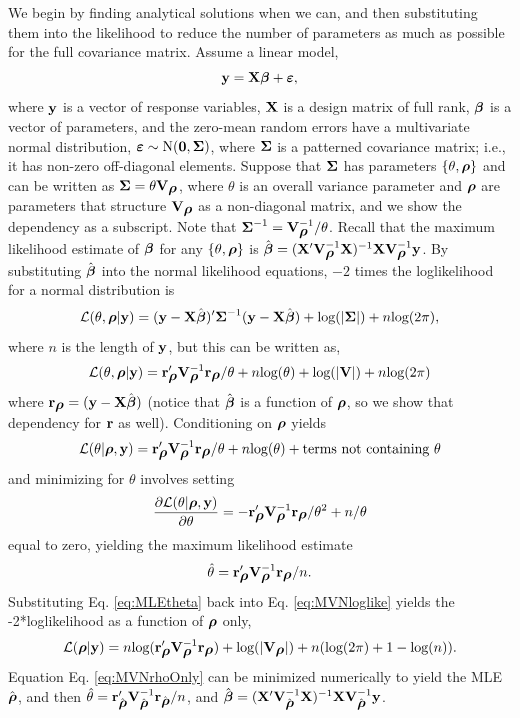 \documentclass[11pt, titlepage]{article}\usepackage[]{graphicx}\usepackage[]{color}
\begin{document}
\begin{spacing}{1.9}
\begin{flushleft}
We begin by finding analytical solutions when we can, and then substituting them into the likelihood to reduce the number of parameters as much as possible for the full covariance matrix.  Assume a linear model,
\[
  \by = \bX\bbeta + \bvarepsilon,
\]
where $\by$ is a vector of response variables, $\bX$ is a design matrix of full rank, $\bbeta$ is a vector of parameters, and the zero-mean random errors have a multivariate normal distribution, $\bvarepsilon \sim \textrm{N}(\bzero,\bSigma)$, where $\bSigma$ is a patterned covariance matrix; i.e., it has non-zero off-diagonal elements.  Suppose that $\bSigma$ has parameters $\{\theta,\brho\}$ and can be written as $\bSigma = \theta\bV_{\brho}$, where $\theta$ is an overall variance parameter and $\brho$ are parameters that structure $\bV_{\brho}$ as a non-diagonal matrix, and we show the dependency as a subscript. Note that $\bSigma\upi = \bV\upi_{\brho}/\theta$. Recall that the maximum likelihood estimate of $\bbeta$ for any $\{\theta,\brho\}$ is $\hat{\bbeta} = (\bX\upp\bV\upi_{\brho}\bX)\upi\bX\bV\upi_{\brho}\by$. By substituting $\hat{\bbeta}$ into the normal likelihood equations, $-2$ times the loglikelihood for a normal distribution is
\[
  \cL(\theta,\brho|\by) = (\by - \bX\hat{\bbeta})\upp\bSigma\upi(\by - \bX\hat{\bbeta}) + \log(|\bSigma|) + n\log(2\pi),
\]
where $n$ is the length of $\by$, but this can be written as,
\begin{equation}\label{eq:MVNloglike}
\cL(\theta,\brho|\by) = \br_{\brho}\upp\bV\upi_{\brho}\br_{\brho}/\theta + n\log(\theta) + \log(|\bV|) + n\log(2\pi)
\end{equation}
where $\br_{\brho} = (\by - \bX\hat{\bbeta})$ (notice that $\hat{\bbeta}$ is a function of $\brho$, so we show that dependency for $\br$ as well).  Conditioning on $\brho$ yields 
\[
\cL(\theta|\brho,\by) = \br_{\brho}\upp\bV\upi_{\brho}\br_{\brho}/\theta + n\log(\theta)+ \textrm{terms not containing } \theta
\]
and minimizing for $\theta$ involves setting
\[
\frac{\partial \cL(\theta|\brho,\by)}{\partial \theta} = -\br\upp_{\brho}\bV\upi_{\brho}\br_{\brho}/\theta^2 + n/\theta
\]
equal to zero, yielding the maximum likelihood estimate
\begin{equation}\label{eq:MLEtheta}
 \hat{\theta} = \br\upp_{\brho}\bV\upi_{\brho}\br_{\brho}/n.
\end{equation}
Substituting Eq. \ref{eq:MLEtheta} back into Eq. \ref{eq:MVNloglike} yields the -2*loglikelihood as a function of $\brho$ only,
\begin{equation}\label{eq:MVNrhoOnly}
\cL(\brho|\by) = n\log(\br\upp_{\brho}\bV\upi_{\brho}\br_{\brho}) + \log(|\bV_{\brho}|) + n(\log(2\pi) + 1 - \log(n)). 
\end{equation}
Equation Eq. \ref{eq:MVNrhoOnly} can be minimized numerically to yield the MLE $\hat{\brho}$, and then $\hat{\theta} = \br\upp_{\hat{\brho}}\bV\upi_{\hat{\brho}}\br_{\hat{\brho}}/n$, and  $\hat{\bbeta} = (\bX\upp\bV\upi_{\hat{\brho}}\bX)\upi\bX\bV\upi_{\hat{\brho}}\by$.


\end{flushleft}
\end{spacing}
\end{document}
